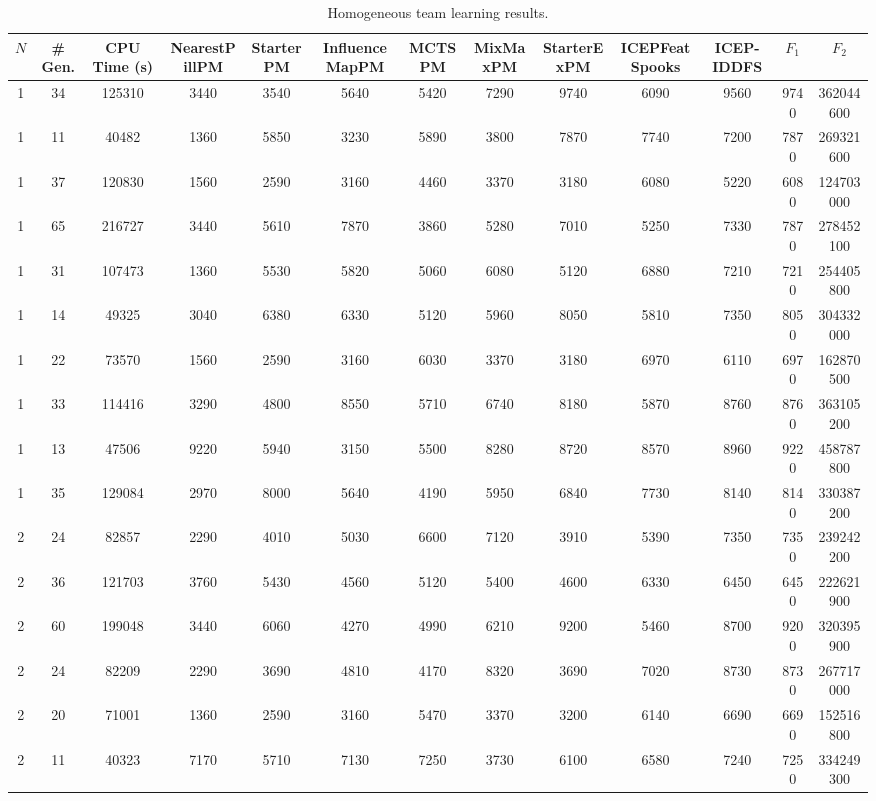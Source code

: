 \documentclass[journal]{IEEEtran}
\begin{document}
\begin{table}
\caption{Homogeneous team learning results.}
\label{tab:results_homogeneous}
\centering
\footnotesize
\begin{tabular}{|ccc|cccccccc|cc|}
\hline																				
$N$	&	\# Gen.	&	CPU Time (s)	&	NearestPillPM	&	StarterPM	&	InfluenceMapPM	&	MCTSPM	&	MixMaxPM	&	StarterExPM	&	ICEPFeatSpooks	&	ICEP-IDDFS	&	$F_1$	&	$F_2$	\\
\hline																				
1	&	34	&	125310	&	3440	&	3540	&	5640	&	5420	&	7290	&	9740	&	6090	&	9560	&	9740	&	362044600	\\
1	&	11	&	40482	&	1360	&	5850	&	3230	&	5890	&	3800	&	7870	&	7740	&	7200	&	7870	&	269321600	\\
1	&	37	&	120830	&	1560	&	2590	&	3160	&	4460	&	3370	&	3180	&	6080	&	5220	&	6080	&	124703000	\\
1	&	65	&	216727	&	3440	&	5610	&	7870	&	3860	&	5280	&	7010	&	5250	&	7330	&	7870	&	278452100	\\
1	&	31	&	107473	&	1360	&	5530	&	5820	&	5060	&	6080	&	5120	&	6880	&	7210	&	7210	&	254405800	\\
1	&	14	&	49325	&	3040	&	6380	&	6330	&	5120	&	5960	&	8050	&	5810	&	7350	&	8050	&	304332000	\\
1	&	22	&	73570	&	1560	&	2590	&	3160	&	6030	&	3370	&	3180	&	6970	&	6110	&	6970	&	162870500	\\
1	&	33	&	114416	&	3290	&	4800	&	8550	&	5710	&	6740	&	8180	&	5870	&	8760	&	8760	&	363105200	\\
1	&	13	&	47506	&	9220	&	5940	&	3150	&	5500	&	8280	&	8720	&	8570	&	8960	&	9220	&	458787800	\\
1	&	35	&	129084	&	2970	&	8000	&	5640	&	4190	&	5950	&	6840	&	7730	&	8140	&	8140	&	330387200	\\
\hline
2	&	24	&	82857	&	2290	&	4010	&	5030	&	6600	&	7120	&	3910	&	5390	&	7350	&	7350	&	239242200	\\
2	&	36	&	121703	&	3760	&	5430	&	4560	&	5120	&	5400	&	4600	&	6330	&	6450	&	6450	&	222621900	\\
2	&	60	&	199048	&	3440	&	6060	&	4270	&	4990	&	6210	&	9200	&	5460	&	8700	&	9200	&	320395900	\\
2	&	24	&	82209	&	2290	&	3690	&	4810	&	4170	&	8320	&	3690	&	7020	&	8730	&	8730	&	267717000	\\
2	&	20	&	71001	&	1360	&	2590	&	3160	&	5470	&	3370	&	3200	&	6140	&	6690	&	6690	&	152516800	\\
2	&	11	&	40323	&	7170	&	5710	&	7130	&	7250	&	3730	&	6100	&	6580	&	7240	&	7250	&	334249300	\\

\end{tabular}
\end{table}
\end{document}
